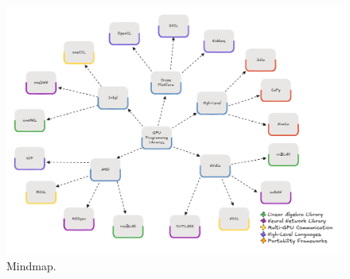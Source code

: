 \begin{figure}[th]
	\centering
	\includegraphics[width=\linewidth]{figures/mindmap-cuda}
	\caption{Mindmap.}
	\label{fig:mindmap-cuda}
\end{figure}

